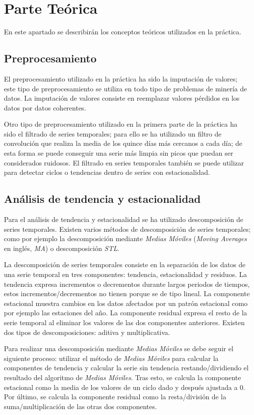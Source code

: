 \chapter{Parte Teórica}
En este apartado se describirán los conceptos teóricos utilizados en la práctica.
\section{Preprocesamiento}
El preprocesamiento utilizado en la práctica ha sido la imputación de valores; este tipo de preprocesamiento se utiliza en todo tipo de problemas de minería de datos. La imputación de valores consiste en reemplazar valores pérdidos en los datos por datos coherentes. \newline

Otro tipo de preprocesamiento utilizado en la primera parte de la práctica ha sido el filtrado de series temporales; para ello se ha utilizado un filtro de convolución que realiza la media de los quince días más cercanos a cada día; de esta forma se puede conseguir una serie más limpia sin picos que puedan ser considerados ruidosos. El filtrado en series temporales también se puede utilizar para detectar ciclos o tendencias dentro de series con estacionalidad.
\section{Análisis de tendencia y estacionalidad}
Para el análisis de tendencia y estacionalidad se ha utilizado descomposición de series temporales. Existen varios métodos de descomposición de series temporales; como por ejemplo la descomposición mediante \textit{Medias Móviles} (\textit{Moving Averages} en inglés, \textit{MA}) o descomposición \textit{STL}. \newline

La descomposición de series temporales consiste en la separación de los datos de una serie temporal en tres componentes: tendencia, estacionalidad y residuos. La tendencia expresa incrementos o decrementos durante largos periodos de tiempos, estos incrementos/decrementos no tienen porque se de tipo lineal. La componente estacional muestra cambios en los datos afectados por un patrón estacional como por ejemplo las estaciones del año. La componente residual expresa el resto de la serie temporal al eliminar los valores de las dos componentes anteriores. Existen dos tipos de descomposiciones: aditiva y multiplicativa. \newline

Para realizar una descomposición mediante \textit{Medias Móviles} se debe seguir el siguiente proceso: utilizar el método de \textit{Medias Móviles} para calcular la componentes de tendencia y calcular la serie sin tendencia restando/dividiendo el resultado del algoritmo de \textit{Medias Móviles}. Tras esto, se calcula la componente estacional como la media de los valores de un ciclo dado y después ajustada a 0. Por último, se calcula la componente residual como la resta/división de la suma/multiplicación de las otras dos componentes.\newline

